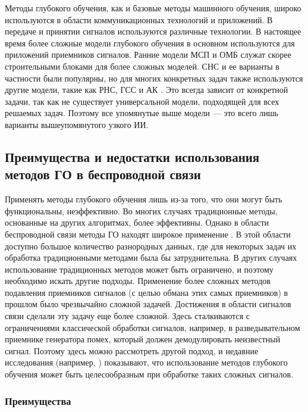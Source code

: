 
\FloatBarrier

Методы глубокого обучения, как и базовые методы машинного обучения, широко используются в области коммуникационных технологий и приложений. В передаче и принятии сигналов используются различные технологии. В настоящее время более сложные модели глубокого обучения в основном используются для приложений приемников сигналов. Ранние модели МСП и ОМБ служат скорее строительными блоками для более сложных моделей. СНС и ее варианты \cite{quavdeeplearn} в частности были популярны, но для многих конкретных задач также используются другие модели, такие как РНС, ГСС и АК \cite{mitigatingdeeplearn}. Это всегда зависит от конкретной задачи, так как не существует универсальной модели, подходящей для всех решаемых задач. Поэтому все упомянутые выше модели — это всего лишь варианты вышеупомянутого узкого ИИ.

\subsection*{Преимущества и недостатки использования методов ГО в беспроводной связи}

Применять методы глубокого обучения лишь из-за того, что они могут быть функциональны, неэффективно. Во многих случаях традиционные методы, основанные на других алгоритмах, более эффективны. Однако в области беспроводной связи методы ГО находят широкое применение \cite{radiosproof}. В этой области доступно большое количество разнородных данных, где для некоторых задач их обработка традиционными методами была бы затруднительна. В других случаях использование традиционных методов может быть ограничено, и поэтому необходимо искать другие подходы. Применение более сложных методов подавления приемников сигналов (с целью обмана этих самых приемников) в прошлом было чрезвычайно сложной задачей. Достижения в области сигналов связи сделали эту задачу еще более сложной. Здесь сталкиваются с ограничениями классической обработки сигналов, например, в разведывательном приемнике генератора помех, который должен демодулировать неизвестный сигнал. Поэтому здесь можно рассмотреть другой подход, и недавние исследования (например, \cite{recieverbasedondl}) показывают, что использование методов глубокого обучения может быть целесообразным при обработке таких сложных сигналов.

\subsubsection*{Преимущества}

